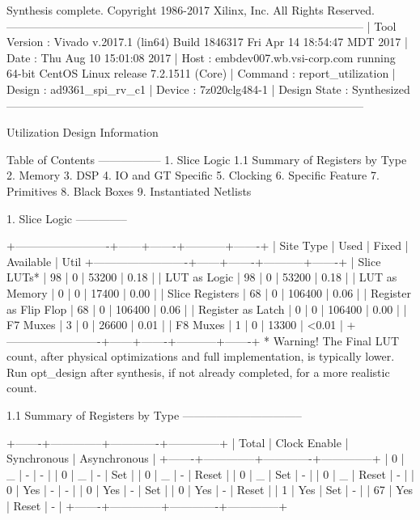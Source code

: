 \documentclass{article}
\begin{document}
\fi
\iffalse
Synthesis complete.
Copyright 1986-2017 Xilinx, Inc. All Rights Reserved.
-----------------------------------------------------------------------------------------------
| Tool Version : Vivado v.2017.1 (lin64) Build 1846317 Fri Apr 14 18:54:47 MDT 2017
| Date         : Thu Aug 10 15:01:08 2017
| Host         : embdev007.wb.vsi-corp.com running 64-bit CentOS Linux release 7.2.1511 (Core)
| Command      : report_utilization
| Design       : ad9361_spi_rv_c1
| Device       : 7z020clg484-1
| Design State : Synthesized
-----------------------------------------------------------------------------------------------

Utilization Design Information

Table of Contents
-----------------
1. Slice Logic
1.1 Summary of Registers by Type
2. Memory
3. DSP
4. IO and GT Specific
5. Clocking
6. Specific Feature
7. Primitives
8. Black Boxes
9. Instantiated Netlists

1. Slice Logic
--------------

+-------------------------+------+-------+-----------+-------+
|        Site Type        | Used | Fixed | Available | Util%
+-------------------------+------+-------+-----------+-------+
| Slice LUTs*             |   98 |     0 |     53200 |  0.18 |
|   LUT as Logic          |   98 |     0 |     53200 |  0.18 |
|   LUT as Memory         |    0 |     0 |     17400 |  0.00 |
| Slice Registers         |   68 |     0 |    106400 |  0.06 |
|   Register as Flip Flop |   68 |     0 |    106400 |  0.06 |
|   Register as Latch     |    0 |     0 |    106400 |  0.00 |
| F7 Muxes                |    3 |     0 |     26600 |  0.01 |
| F8 Muxes                |    1 |     0 |     13300 | <0.01 |
+-------------------------+------+-------+-----------+-------+
* Warning! The Final LUT count, after physical optimizations and full implementation, is typically lower. Run opt_design after synthesis, if not already completed, for a more realistic count.


1.1 Summary of Registers by Type
--------------------------------

+-------+--------------+-------------+--------------+
| Total | Clock Enable | Synchronous | Asynchronous |
+-------+--------------+-------------+--------------+
| 0     |            _ |           - |            - |
| 0     |            _ |           - |          Set |
| 0     |            _ |           - |        Reset |
| 0     |            _ |         Set |            - |
| 0     |            _ |       Reset |            - |
| 0     |          Yes |           - |            - |
| 0     |          Yes |           - |          Set |
| 0     |          Yes |           - |        Reset |
| 1     |          Yes |         Set |            - |
| 67    |          Yes |       Reset |            - |
+-------+--------------+-------------+--------------+
\end{document}
